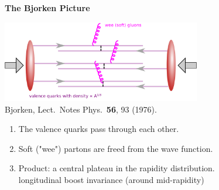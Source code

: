 \documentclass[9pt,a4paper,unknownkeysallowed,xcolor=dvipsnames,aspectratio=43]{beamer}
\begin{document}
\begin{frame}{\bf\huge The Bjorken Picture}	\vspace{4mm}
\begin{center}
\includegraphics[width=0.65\textwidth]{fig/Bjorken}\\
{\tiny  {\color{teablue}
Bjorken,
  Lect.\ Notes Phys.\  {\bf 56}, 93 (1976).
  }}
\end{center}
\begin{enumerate}
\item{\large The valence quarks pass through each other.}
\vspace{2mm}
\item{\large Soft ("wee") partons are freed from the wave function.}
\vspace{2mm}
\item{\large Product: a central plateau in the rapidity distribution.}\\
\vspace{2mm}
    longitudinal boost invariance (around mid-rapidity)

\end{enumerate}
\end{frame}
\end{document}
